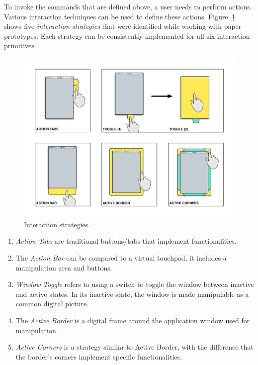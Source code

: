 To invoke the commands that are defined above, a user needs to perform actions.
Various interaction techniques can be used to define these actions.
Figure~\ref{strategies} shows five \emph{interaction strategies} that were identified while working with paper prototypes.
Each strategy can be consistently implemented for all six interaction primitives.

\begin{figure}[htb]
\centering
\includegraphics[width=1\linewidth]{images/strategies}
\caption{Interaction strategies.}
\label{strategies}
\end{figure}

\begin{enumerate}
\item{\emph{Action Tabs} are traditional buttons/tabs that implement functionalities.}
\item{The \emph{Action Bar} can be compared to a virtual touchpad, it includes a manipulation area and buttons.}
\item{\emph{Window Toggle} refers to using a switch to toggle the window between inactive and active states. In its inactive state, the window is made manipulable as a common digital picture.}
\item{The \emph{Active Border} is a digital frame around the application window used for manipulation.}
\item{\emph{Active Corners} is a strategy similar to Active Border, with the difference that the border's corners implement specific functionalities.}
\end{enumerate}

